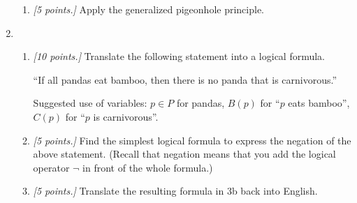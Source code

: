 \documentclass[12pt]{amsart}
\begin{document}
\begin{enumerate}[label=\arabic*.,itemsep=10pt, leftmargin=*]
\begin{enumerate}
            \item 
        \textit{[5 points.]}
            Apply the generalized pigeonhole principle.
        \end{enumerate}


    \item 
        \begin{enumerate}
            \item 
        \textit{[10 points.]}
            Translate the following statement into a logical formula.
                
                ``If all pandas eat bamboo, then there is no panda that is carnivorous.''
                
            Suggested use of variables: $p\in P$ for pandas, $B(p)$ for ``$p$ eats bamboo'', $C(p)$ for  ``$p$ is carnivorous''.

            \item 
        \textit{[5 points.]}
            Find the simplest logical formula
                to express the negation of the above statement. 
            (Recall that negation means that you add the logical operator $\neg$ in front of the whole formula.)

            \item 
        \textit{[5 points.]}
            Translate the resulting formula in 3b back into English. 
        \end{enumerate}
\end{enumerate}
\end{document}

